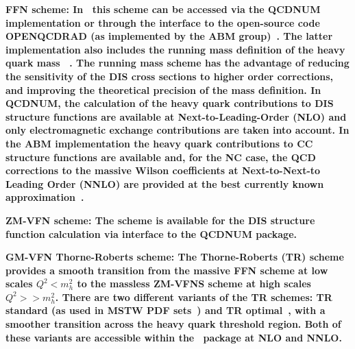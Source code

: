 \begin{description}
\item \bf {FFN scheme:} \rm
In \fitter\ this scheme can be accessed via the 
QCDNUM implementation or through the interface to the open-source code OPENQCDRAD (as implemented by the ABM group)~\cite{openqcdrad:page}.
The latter implementation also includes the running mass definition of the heavy quark 
mass ~\cite{Alekhin:runm}.
The running mass scheme has the advantage of reducing the sensitivity of the DIS cross sections to
higher order corrections, and improving the theoretical precision of the mass definition. 
In QCDNUM, the calculation of the heavy quark contributions to DIS structure functions
are available at Next-to-Leading-Order (NLO) and only electromagnetic exchange contributions are taken into account.
In the ABM implementation the heavy quark contributions to CC structure functions are available 
and, for the NC case, the QCD corrections to the massive Wilson coefficients at Next-to-Next-to Leading Order (NNLO)
are provided at the best currently known approximation~\cite{SMoch:npb864}.
\item  
\bf {ZM-VFN scheme:} \rm 
The scheme is available for the DIS structure function calculation via interface to the QCDNUM package.
%
\item \bf {GM-VFN Thorne-Roberts scheme:} \rm
%
The Thorne-Roberts (TR) scheme provides a smooth transition from the massive FFN
scheme at low scales $Q^2<m_h^2$ to the massless ZM-VFNS scheme at  
high scales $Q^2>>m_h^2$.
%
There are two different variants of the TR schemes: TR standard 
(as used in MSTW PDF 
sets~\cite{Thorne:1997ga,Thorne:2006qt,MSTWpdf}) 
and TR optimal~\cite{Thorne:6180}, with a smoother transition across the heavy quark threshold region.
Both of these variants are accessible within the \fitter\ package at 
NLO and NNLO.  
\vspace{0.1cm}

\end{description}

